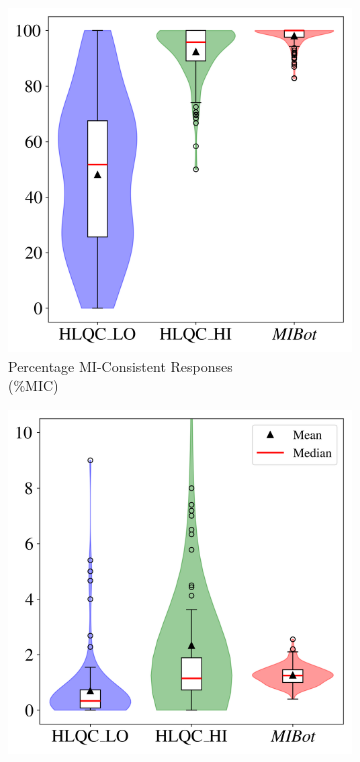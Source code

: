 \begin{figure}[htpb!]
    \centering
    \begin{subfigure}[b]{0.32\textwidth}
        \centering
        \captionsetup{justification=centering}
        \includegraphics[width=\textwidth]{fig/mic.png}
        \caption{Percentage MI-Consistent Responses\\(\%MIC)}
        \label{fig:mic}
    \end{subfigure}
    \hfill
    \begin{subfigure}[b]{0.32\textwidth}
        \centering
        \includegraphics[width=\textwidth]{fig/rq.png}

\end{subfigure}
\end{figure}
